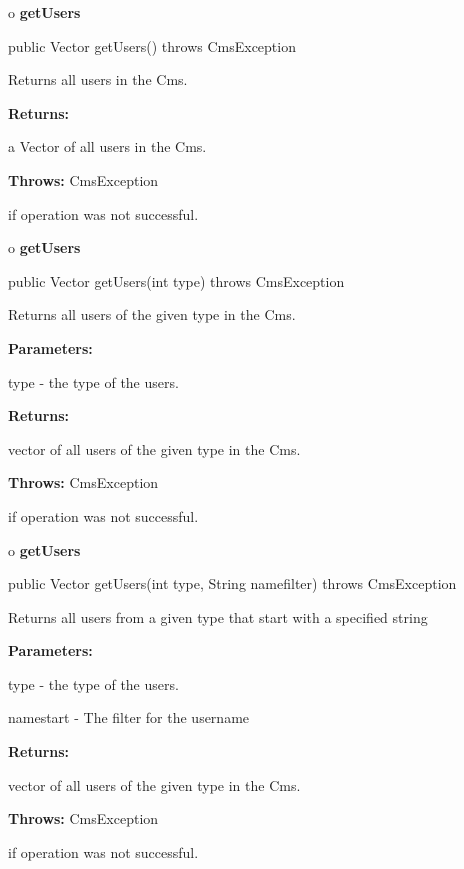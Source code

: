o {\bf getUsers} 

\begin{PRE}
 public Vector getUsers() throws CmsException
\end{PRE}

\begin{description}
\htmlDD Returns all users in the Cms. 

\begin{description}
\item {\bf Returns:}  

a Vector of all users in the Cms.  
\item {\bf Throws:} CmsException  

if operation was not successful.  
\end{description}

\end{description}

o {\bf getUsers} 

\begin{PRE}
 public Vector getUsers(int type) throws CmsException
\end{PRE}

\begin{description}
\htmlDD Returns all users of the given type in the Cms. 

\begin{description}
\item {\bf Parameters:}  

type - the type of the users.  
\item {\bf Returns:}  

vector of all users of the given type in the Cms.  
\item {\bf Throws:} CmsException  

if operation was not successful.  
\end{description}

\end{description}

o {\bf getUsers} 

\begin{PRE}
 public Vector getUsers(int type,
                        String namefilter) throws CmsException
\end{PRE}

\begin{description}
\htmlDD Returns all users from a given type that start with a specified string


\begin{description}
\item {\bf Parameters:}  

type - the type of the users.  

namestart - The filter for the username  
\item {\bf Returns:}  

vector of all users of the given type in the Cms.  
\item {\bf Throws:} CmsException  

if operation was not successful.  
\end{description}

\end{description}

